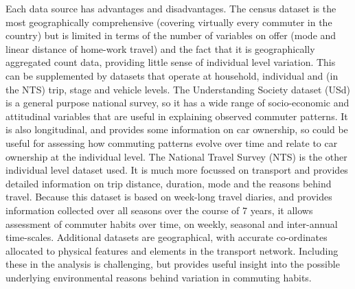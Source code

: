 Each data source has advantages and disadvantages.
The census dataset is the most geographically comprehensive 
(covering virtually every commuter in the country) but is limited in terms of
the number of variables on offer (mode and linear distance of home-work
travel) and the fact that it is geographically aggregated count data, providing
little sense of individual level variation. This can be supplemented by datasets
that operate at household, individual and (in the NTS) trip, stage and
vehicle levels. The Understanding Society dataset (USd) is a general purpose
national survey, so it has a wide range of socio-economic and attitudinal variables
that are useful in explaining observed commuter patterns. It is also
longitudinal, and provides some information on car ownership, so could be
useful for assessing how commuting patterns evolve over time and relate to car
ownership at the individual
level. The National Travel Survey (NTS) is the other individual level dataset
used. It is
much more focussed on transport and
provides detailed information on trip distance, duration, mode and the
reasons behind travel. Because this dataset is based on
week-long travel diaries, and provides information collected over all seasons
over the course of 7 years, it allows assessment of commuter habits over time,
on weekly, seasonal and inter-annual time-scales. Additional datasets are
geographical, with accurate co-ordinates allocated to physical features and
elements in the transport network. Including these
in the analysis is challenging, but provides useful insight into the possible
underlying environmental reasons behind variation in commuting habits.

